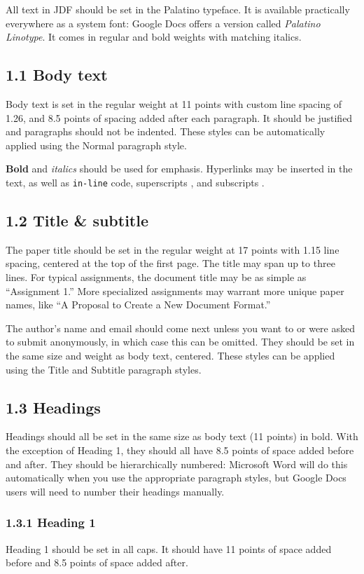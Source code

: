 {{{{All text in JDF should be set in the Palatino typeface. It is available practically everywhere as a system font: Google Docs offers a version called \emph{Palatino Linotype}. It comes in regular and bold weights with matching italics.

\subsection*{1.1 Body text}
Body text is set in the regular weight at 11 points with custom line spacing of 1.26, and 8.5 points of spacing added after each paragraph. It should be justified and paragraphs should not be indented. These styles can be automatically applied using the Normal paragraph style.

\textbf{Bold} and \emph{italics} should be used for emphasis. Hyperlinks may be inserted in the text, as well as \texttt{in-line} code, superscripts , and subscripts .

\subsection*{1.2 Title \& subtitle}
The paper title should be set in the regular weight at 17 points with 1.15 line spacing, centered at the top of the first page. The title may span up to three lines. For typical assignments, the document title may be as simple as “Assignment 1.” More specialized assignments may warrant more unique paper names, like “A Proposal to Create a New Document Format.”

The author’s name and email should come next unless you want to or were asked to submit anonymously, in which case this can be omitted. They should be set in the same size and weight as body text, centered. These styles can be applied using the Title and Subtitle paragraph styles.

\subsection*{1.3 Headings}
Headings should all be set in the same size as body text (11 points) in bold. With the exception of Heading 1, they should all have 8.5 points of space added before and after. They should be hierarchically numbered: Microsoft Word will do this automatically when you use the appropriate paragraph styles, but Google Docs users will need to number their headings manually.

\subsubsection*{1.3.1 Heading 1}
Heading 1 should be set in all caps. It should have 11 points of space added before and 8.5 points of space added after.

}}}}
